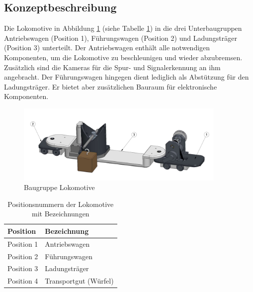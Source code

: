\documentclass[../../main.tex]{subfiles}
\begin{document}
    \subsection{Konzeptbeschreibung}
    Die Lokomotive in Abbildung \ref{fig:bg_lokomotive} (siehe Tabelle \ref{tab:bg_lokomotive}) in die drei Unterbaugruppen Antriebswagen (Position 1), Führungswagen (Position 2) und Ladungsträger (Position 3) unterteilt. Der Antriebswagen enthält alle notwendigen Komponenten, um die Lokomotive zu beschleunigen und wieder abzubremsen. Zusätzlich sind die Kameras für die Spur- und Signalerkennung an ihm angebracht. Der Führungswagen hingegen dient lediglich als Abstützung für den Ladungsträger. Er bietet aber zusätzlichen Bauraum für elektronische Komponenten.\\

    \begin{figure}[H] %
        \centering
        \includegraphics[width=0.9\textwidth]{Lokomotive.png}
        \caption{Baugruppe Lokomotive}
        \label{fig:bg_lokomotive}
    \end{figure}

    \begin{table}[H] \centering
        \begin{tabular}{|l|l|}
        \hline
        \textbf{Position} & \textbf{Bezeichnung}\\
        \hline
        Position 1          & Antriebswagen\\
         \hline
        Position 2          & Führungswagen\\
        \hline
        Position 3          & Ladungsträger\\
        \hline
        Position 4          & Transportgut (Würfel)\\
        \hline
        \end{tabular}
        
        \caption{Positionsnummern der Lokomotive mit Bezeichnungen}
        \label{tab:bg_lokomotive}
    \end{table}
\end{document}
